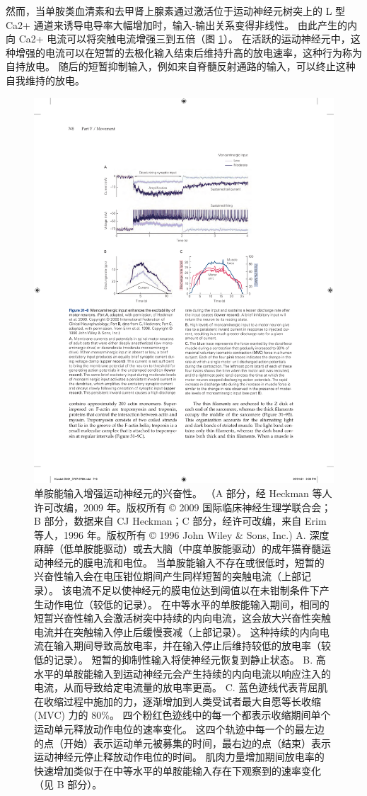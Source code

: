 然而，当单胺类血清素和去甲肾上腺素通过激活位于运动神经元树突上的 L 型 Ca2+ 通道来诱导电导率大幅增加时，输入-输出关系变得非线性。 由此产生的内向 Ca2+ 电流可以将突触电流增强三到五倍（图 \ref{fig:31_8}）。
在活跃的运动神经元中，这种增强的电流可以在短暂的去极化输入结束后维持升高的放电速率，这种行为称为自持放电。 随后的短暂抑制输入，例如来自脊髓反射通路的输入，可以终止这种自我维持的放电。

\begin{figure}[htbp]
	\centering
	\includegraphics[width=0.7\linewidth]{chap31/fig_31_8}
	\caption{单胺能输入增强运动神经元的兴奋性。 （A 部分，经 Heckman 等人许可改编，2009 年。版权所有 © 2009 国际临床神经生理学联合会；B 部分，数据来自 CJ Heckman；C 部分，经许可改编，来自 Erim 等人，1996 年。版权所有 © 1996 John Wiley \& Sons, Inc.) A. 深度麻醉（低单胺能驱动）或去大脑（中度单胺能驱动）的成年猫脊髓运动神经元的膜电流和电位。 当单胺能输入不存在或很低时，短暂的兴奋性输入会在电压钳位期间产生同样短暂的突触电流（上部记录）。 该电流不足以使神经元的膜电位达到阈值以在未钳制条件下产生动作电位（较低的记录）。 在中等水平的单胺能输入期间，相同的短暂兴奋性输入会激活树突中持续的内向电流，这会放大兴奋性突触电流并在突触输入停止后缓慢衰减（上部记录）。 这种持续的内向电流在输入期间导致高放电率，并在输入停止后维持较低的放电率（较低的记录）。 短暂的抑制性输入将使神经元恢复到静止状态。 B. 高水平的单胺能输入到运动神经元会产生持续的内向电流以响应注入的电流，从而导致给定电流量的放电率更高。 C. 蓝色迹线代表背屈肌在收缩过程中施加的力，逐渐增加到人类受试者最大自愿等长收缩 (MVC) 力的 80\%。 四个粉红色迹线中的每一个都表示收缩期间单个运动单元释放动作电位的速率变化。 这四个轨迹中每一个的最左边的点（开始）表示运动单元被募集的时间，最右边的点（结束）表示运动神经元停止释放动作电位的时间。 肌肉力量增加期间放电率的快速增加类似于在中等水平的单胺能输入存在下观察到的速率变化（见 B 部分）。}
	\label{fig:31_8}
\end{figure}

